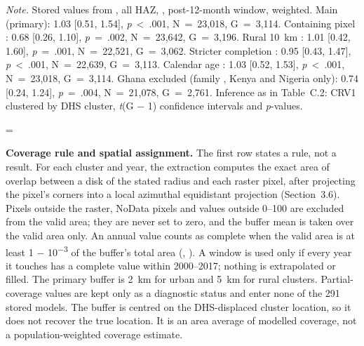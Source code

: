 \begin{ThesisTableNote}

\raggedright

\emph{Note.} Stored values from , all HAZ, , post-12-month window, weighted. Main  (primary): 1.03 {[}0.51, 1.54{]}, \emph{p}~\textless~.001, N~=~23,018, G~=~3,114. Containing pixel : 0.68 {[}0.26, 1.10{]}, \emph{p}~=~.002, N~=~23,642, G~=~3,196. Rural 10~km : 1.01 {[}0.42, 1.60{]}, \emph{p}~=~.001, N~=~22,521, G~=~3,062. Stricter completion : 0.95 {[}0.43, 1.47{]}, \emph{p}~\textless~.001, N~=~22,639, G~=~3,113. Calendar age : 1.03 {[}0.52, 1.53{]}, \emph{p}~\textless~.001, N~=~23,018, G~=~3,114. Ghana excluded  (family , Kenya and Nigeria only): 0.74 {[}0.24, 1.24{]}, \emph{p}~=~.004, N~=~21,078, G~=~2,761. Inference as in Table~C.2: CRV1 clustered by DHS cluster, \emph{t}(G − 1) confidence intervals and \emph{p}-values.

\end{ThesisTableNote}

\begingroup\edef\ThesisSavedIndent{\the\parindent}\raggedright\parindent=\ThesisSavedIndent\relax{}

\textbf{Coverage rule and spatial assignment.} The first row states a rule, not a result. For each cluster and year, the extraction computes the exact area of overlap between a disk of the stated radius and each raster pixel, after projecting the pixel's corners into a local azimuthal equidistant projection (Section~3.6). Pixels outside the raster, NoData pixels and values outside 0--100 are excluded from the valid area; they are never set to zero, and the buffer mean is taken over the valid area only. An annual value counts as complete when the valid area is at least 1 − 10\textsuperscript{−3} of the buffer's total area (, ). A window is used only if every year it touches has a complete value within 2000--2017; nothing is extrapolated or filled. The primary buffer is 2~km for urban and 5~km for rural clusters. Partial-coverage values are kept only as a diagnostic status and enter none of the 291 stored models. The buffer is centred on the DHS-displaced cluster location, so it does not recover the true location. It is an area average of modelled coverage, not a population-weighted coverage estimate.

